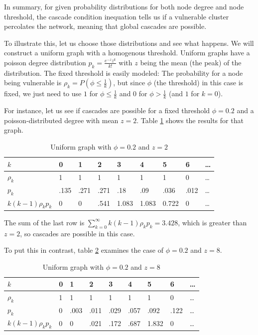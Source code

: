 \documentclass{sig-alternate-05-2015}
\begin{document}
In summary, for given probability distributions for both node degree and node threshold, the cascade condition inequation tells us if a vulnerable cluster percolates the network, meaning that global cascades are possible.

To illustrate this, let us choose those distributions and see what happens. We will construct a uniform graph with a homogenous threshold. Uniform graphs have a poisson degree distribution $p_k = \frac{e^{-z}z^k}{k!}$ with $z$ being the mean (the peak) of the distribution. The fixed threshold is easily modeled: The probability for a node being vulnerable is $\rho_k = P(\phi \leq \frac{1}{k})$, but since $\phi$ (the threshold) in this case is fixed, we just need to use $1$ for $\phi \leq \frac{1}{k}$ and $0$ for $\phi > \frac{1}{k}$ (and $1$ for $k = 0$).

For instance, let us see if cascades are possible for a fixed threshold $\phi = 0.2$ and a poisson-distributed degree with mean $z = 2$. Table \ref{tab:z2} shows the results for that graph.

\begin{table}[t!]
\centering
\caption{Uniform graph with $\phi = 0.2$ and $z = 2$}
\label{tab:z2}
\begin{tabular}{|l|l|l|l|l|l|l|l|l|}
\hline
$k$                       & 0     & 1      & 2     & 3      & 4      & 5      & 6     & \ldots\\ \hline
$\rho_k$                  & 1     & 1      & 1     & 1      & 1      & 1      & 0     & \ldots\\ \hline
$p_k$                     & .135  & .271   & .271  & .18    & .09    & .036   & .012  & \ldots\\ \hline
$k (k-1) \rho_k p_k$      & 0     & 0      & .541  & 1.083  & 1.083  & 0.722  & 0     & \ldots\\ \hline
\end{tabular}
\end{table}

The sum of the last row is $\sum_{k=0}^\infty k (k-1) \rho_k p_k = 3.428$, which is greater than $z = 2$, so cascades are possible in this case.

To put this in contrast, table \ref{tab:z8} examines the case of $\phi = 0.2$ and $z = 8$.

\begin{table}
\centering
\caption{Uniform graph with $\phi = 0.2$ and $z = 8$}
\label{tab:z8}
\begin{tabular}{|l|l|l|l|l|l|l|l|l|}
\hline
$k$                       & 0  & 1     & 2     & 3     & 4     & 5      & 6     & \ldots\\ \hline
$\rho_k$                  & 1  & 1     & 1     & 1     & 1     & 1      & 0     & \ldots\\ \hline
$p_k$                     & 0  & .003  & .011  & .029  & .057  & .092   & .122  & \ldots\\ \hline
$k (k-1) \rho_k p_k$      & 0  & 0     & .021  & .172  & .687  & 1.832  & 0     & \ldots\\ \hline
\end{tabular}
\end{table}
\end{document}

